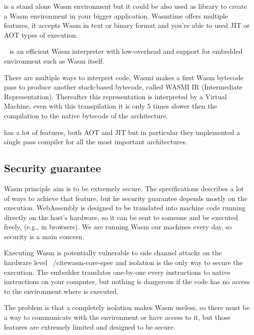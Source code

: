 \documentclass[../main.tex]{subfiles}
\begin{document}
\begin{description}[font=$\bullet$ \scshape\bfseries]
  \item[Wasmtime]
        is a stand alone Wasm environment but it could be also used as library to create a Wasm environment in your bigger application. Wasmtime offers multiple features, it accepts Wasm in text or binary format and you're able to used JIT or AOT types of execution.
  \item[Wasmi]
        ~\cite{wasmi} is an efficient Wasm interpreter with low-overhead and support for embedded environment such as Wasm itself.

        There are multiple ways to interpret code, Wasmi makes a first Wasm bytecode pass to produce another stack-based bytecode, called WASMI IR (Intermediate Representation). Thereafter this representation is interpreted by a Virtual Machine, even with this transpilation it is only 5 times slower then the compilation to the native bytecode of the architecture.

        \item[Wasmer] has a lot of features, both AOT and JIT but in particular they implemented a single pass compiler for all the most important architectures.
\end{description}

\subsection{Security guarantee}

Wasm principle aim is to be extremely secure. The specifications describes a lot of ways to achieve that feature, but he security guarantee depends mostly on the execution. WebAssembly is designed to be translated into machine code running directly on the host’s hardware, so it can be sent to someone and be executed freely, (e.g., in browsers). We are running Wasm our machines every day, so security is a main concern.

Executing Wasm is potentially vulnerable to side channel attacks on the hardware level ~/cite{wasm-core-spec} and isolation is the only way to secure the execution.  The embedder translates one-by-one every instructions to native instructions on your computer, but nothing is dangerous if the code has no access to the environment where is executed.

The problem is that a completely isolation makes Wasm useless, so there must be a way to communicate with the environment or  have access to it, but those features are extremely limited and designed to be secure.
\end{document}

